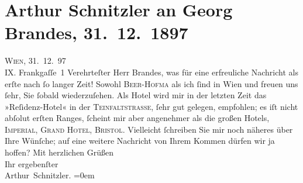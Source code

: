 

         
         \renewcommand{\erwaehntePersonen}{Personen: Richard Beer-Hofmann, Georg Brandes}
         \renewcommand{\erwaehnteOrte}{Orte: Frankgasse 1, Grand Hotel Wien, Hotel Bristol Wien, Hotel Imperial, Residenzhotel, Teinfaltstraße, Wien}
         \renewcommand{\erwaehnteWerke}{}
               \section[Arthur Schnitzler an Georg Brandes, 31. 12. 1897]{ Arthur Schnitzler an Georg Brandes, 31. 12. 1897}\nopagebreak{}\rehead{ }\begin{ledgroupsized}[t]{13cm}\normalsize\beginnumbering{} \toendnotes[C]{\smallbreak\pagebreak[2]} 
\pstart
           \raggedleft{}{\pb}\textsc{Wien}, 31. 12. 97{\\}IX. Frankgaſſe 1\pend
           \pstart{}Verehrteſter Herr Brandes,\pend\pstart
           was für eine erfreuliche Nachricht als erſte nach ſo langer Zeit! Sowohl \textsc{Beer-Hofma{\geminationn}} als ich ſind in Wien und freuen uns ſehr,
               Sie ſobald wiederzuſehen. Als Hotel wird mir in {\pb}der letzten Zeit das »Reſidenz-Hotel« in der
                  \textsc{Teinfaltstraße}, ſehr gut gelegen, empfohlen; es iſt nicht abſolut erſten Ranges, ſcheint mir
               aber angenehmer als die großen Hotels, \textsc{Imperial}, \textsc{Grand Hotel}, \textsc{Bristol}. Vielleicht ſchreiben Sie mir noch näheres {\pb}über Ihre Wünſche; auf eine weitere Nachricht von Ihrem Kommen dürfen wir ja
               hoffen?\pend
           \pstart
           Mit herzlichen Grüßen{\\[\baselineskip]}Ihr ergebenſter{\\[\baselineskip]}\spacefill\mbox{Arthur Schnitzler.}\pend
           \leftskip=0em{}
         
         \endnumbering{}\end{ledgroupsized}  \newcommand{\dateiname}{L00757}\newcommand{\titel}{Arthur Schnitzler an Georg Brandes, 31. 12. 1897}\newcommand{\editorInnen}{Martin Anton Müller und Gerd-Hermann Susen}
      